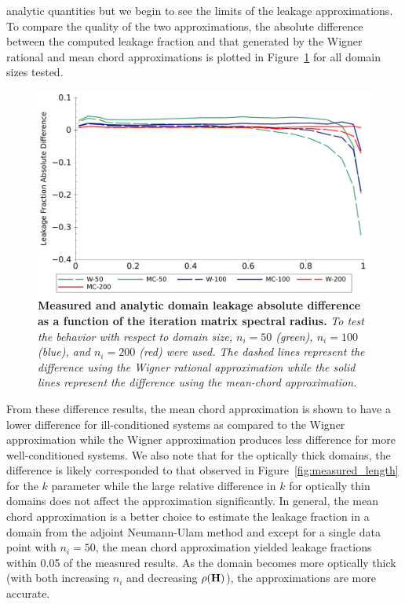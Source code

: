 analytic quantities but we begin to see the limits of the leakage
approximations. To compare the quality of the two approximations, the
absolute difference between the computed leakage fraction and that
generated by the Wigner rational and mean chord approximations is
plotted in Figure~\ref{fig:leakage_error} for all domain sizes
tested. 
\begin{figure}[t!]
  \begin{spacing}{1.0}
    \begin{center}
      \includegraphics[width=6.0in,clip]{chapters/parallel_mc/leakage_error_2.pdf}
    \end{center}
    \caption{\textbf{Measured and analytic domain leakage absolute
        difference as a function of the iteration matrix spectral radius.}
      \textit{To test the behavior with respect to domain size,
        $n_i=50$ (green), $n_i=100$ (blue), and $n_i=200$ (red) were
        used. The dashed lines represent the difference using the Wigner
        rational approximation while the solid lines represent the
        difference using the mean-chord approximation.}}
    \label{fig:leakage_error}
  \end{spacing}
\end{figure}
From these difference results, the mean chord approximation is shown to
have a lower difference for ill-conditioned systems as compared to the
Wigner approximation while the Wigner approximation produces less
difference for more well-conditioned systems. We also note that for the
optically thick domains, the difference is likely corresponded to that
observed in Figure~\ref{fig:measured_length} for the $k$ parameter
while the large relative difference in $k$ for optically thin domains does
not affect the approximation significantly. In general, the mean chord
approximation is a better choice to estimate the leakage fraction in a
domain from the adjoint Neumann-Ulam method and except for a single
data point with $n_i=50$, the mean chord approximation yielded leakage
fractions within 0.05 of the measured results. As the domain becomes
more optically thick (with both increasing $n_i$ and decreasing
$\rho(\mathbf{H})$), the approximations are more accurate.

